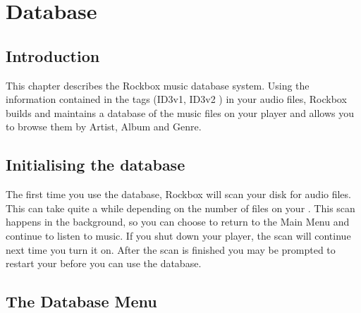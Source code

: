 \section{\label{ref:database}Database}

\subsection{Introduction}
This chapter describes the Rockbox music database system. Using the information
contained in the tags (ID3v1, ID3v2%
) in your audio files, Rockbox builds and maintains a database of the music
files on your player and allows you to browse them by Artist, Album and Genre.

\subsection{Initialising the database}
The first time you use the database, Rockbox will scan your disk for audio files.
This can take quite a while depending on the number of files on your \dap{}.
This scan happens in the background, so you can choose to return to the
Main Menu and continue to listen to music.
If you shut down your player, the scan will continue next time you turn it on.
After the scan is finished you may be prompted to restart your \dap{} before
you can use the database.

\subsection{\label{ref:databasemenu}The Database Menu}

